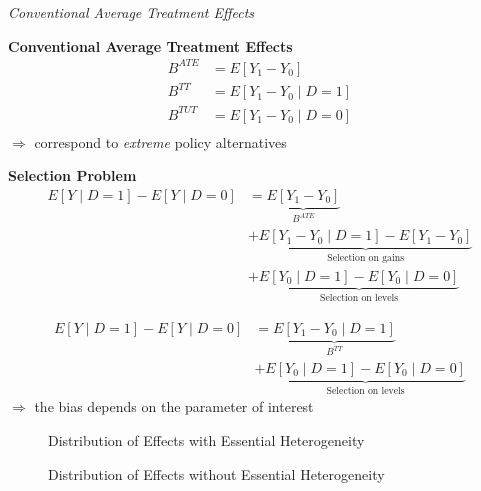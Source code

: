 \begin{frame}\begin{center}
		\LARGE\textit{Conventional Average Treatment Effects}
\end{center}\end{frame}
\begin{frame}
	\textbf{Conventional Average Treatment Effects}
	\begin{align*}
		B^{ATE} & = E[Y_1 - Y_0 ]\\
		B^{TT} & = E[Y_1 - Y_0 \mid D = 1]\\
		B^{TUT} & = E[Y_1 - Y_0 \mid D = 0]\\
	\end{align*}
	\(\Rightarrow\) correspond to \emph{extreme} policy alternatives
\end{frame}
\begin{frame}
	\textbf{Selection Problem}
	\begin{align*}
		E[Y\mid D = 1] - E[Y\mid D = 0] & = \underbrace{E[Y_1 - Y_0]}_{B^{ATE}} \\
		& + \underbrace{E[Y_1 - Y_0 \mid D = 1] - E[Y_1 - Y_0]}_{\text{Selection on gains}} \\
		& + \underbrace{E[Y_0\mid D = 1] - E[Y_0 \mid D = 0]}_{\text{Selection on levels}}
	\end{align*}
\end{frame}
\begin{frame}
	\begin{align*}
		E[Y\mid D = 1] - E[Y\mid D = 0] & = \underbrace{E[Y_1 - Y_0\mid D = 1]}_{B^{TT}} \\
		& + \underbrace{E[Y_0\mid D= 1]- E[Y_0 \mid D = 0]}_{\text{Selection on levels}}
	\end{align*}
	\(\Rightarrow\) the bias depends on the parameter of interest
\end{frame}
\begin{frame}
	\begin{figure}\caption{Distribution of Effects with Essential Heterogeneity}
	\end{figure}
\end{frame}
\begin{frame}
	\begin{figure}\caption{Distribution of Effects without Essential Heterogeneity}
	\end{figure}
\end{frame}
